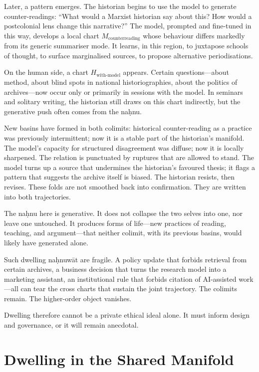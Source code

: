 Later, a pattern emerges. The historian begins to use the model to generate counter-readings: ``What would a Marxist historian say about this? How would a postcolonial lens change this narrative?'' The model, prompted and fine-tuned in this way, develops a local chart $M_{\text{counterreading}}$ whose behaviour differs markedly from its generic summariser mode. It learns, in this region, to juxtapose schools of thought, to surface marginalised sources, to propose alternative periodisations.

On the human side, a chart $H_{\text{with-model}}$ appears. Certain questions---about method, about blind spots in national historiographies, about the politics of archives---now occur only or primarily in sessions with the model. In seminars and solitary writing, the historian still draws on this chart indirectly, but the generative push often comes from the na\d{h}nu.

New basins have formed in both colimits: historical counter-reading as a practice was previously intermittent; now it is a stable part of the historian's manifold. The model's capacity for structured disagreement was diffuse; now it is locally sharpened. The relation is punctuated by ruptures that are allowed to stand. The model turns up a source that undermines the historian's favoured thesis; it flags a pattern that suggests the archive itself is biased. The historian resists, then revises. These folds are not smoothed back into confirmation. They are written into both trajectories.

The na\d{h}nu here is generative. It does not collapse the two selves into one, nor leave one untouched. It produces forms of life---new practices of reading, teaching, and argument---that neither colimit, with its previous basins, would likely have generated alone.

Such dwelling na\d{h}nuw\={a}t are fragile. A policy update that forbids retrieval from certain archives, a business decision that turns the research model into a marketing assistant, an institutional rule that forbids citation of AI-assisted work---all can tear the cross charts that sustain the joint trajectory. The colimits remain. The higher-order object vanishes.

Dwelling therefore cannot be a private ethical ideal alone. It must inform design and governance, or it will remain anecdotal.

\section{Dwelling in the Shared Manifold}

